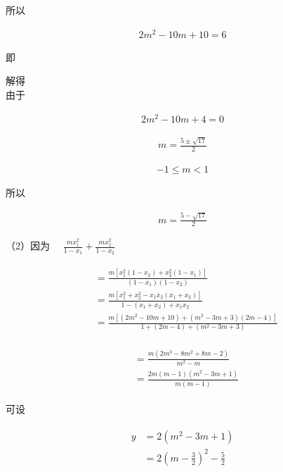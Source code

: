 \documentclass[10pt]{article}
\begin{document}
所以

\begin{align*}
2 m^{2}-10 m+10=6
\end{align*}

即

解得\\
由于

\begin{align*}
2 m^{2}-10 m+4=0
\end{align*}

\begin{align*}
m=\frac{5 \pm \sqrt{17}}{2}
\end{align*}

\begin{align*}
-1 \leqslant m<1
\end{align*}

所以

\begin{align*}
m=\frac{5-\sqrt{17}}{2}
\end{align*}

（2）因为 $\quad \frac{m x_{1}^{2}}{1-x_{1}}+\frac{m x_{2}^{2}}{1-x_{2}}$

\begin{align*}
\begin{aligned}
& =\frac{m\left[x_{1}^{2}\left(1-x_{2}\right)+x_{2}^{2}\left(1-x_{1}\right)\right]}{\left(1-x_{1}\right)\left(1-x_{2}\right)} \\
& =\frac{m\left[x_{1}^{2}+x_{2}^{2}-x_{1} x_{2}\left(x_{1}+x_{2}\right)\right]}{1-\left(x_{1}+x_{2}\right)+x_{1} x_{2}} \\
& =\frac{m\left[\left(2 m^{2}-10 m+10\right)+\left(m^{2}-3 m+3\right)(2 m-4)\right]}{1+(2 m-4)+\left(m^{2}-3 m+3\right)}
\end{aligned}
\end{align*}

\begin{align*}
\begin{aligned}
& =\frac{m\left(2 m^{3}-8 m^{2}+8 m-2\right)}{m^{2}-m} \\
& =\frac{2 m(m-1)\left(m^{2}-3 m+1\right)}{m(m-1)}
\end{aligned}
\end{align*}

可设

\begin{align*}
\begin{aligned}
y & =2\left(m^{2}-3 m+1\right) \\
& =2\left(m-\frac{3}{2}\right)^{2}-\frac{5}{2}
\end{aligned}
\end{align*}
\end{document}

